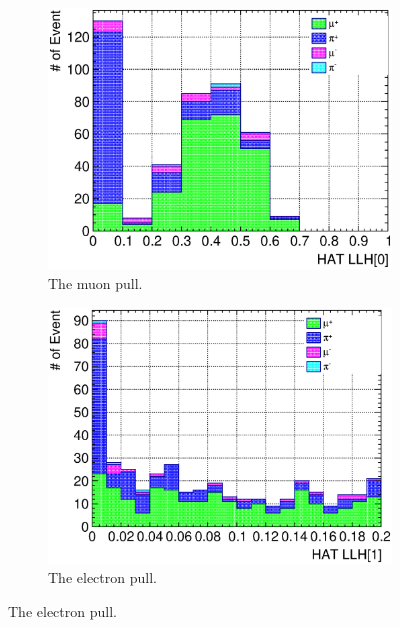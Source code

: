           \begin{figure}
               \centering
               \begin{subfigure}{\dbfigwid\textwidth}
                    \includegraphics[width=\textwidth]{figures/sel/sspi_TOP_hat_pid0_stack_al5.eps}
                    \caption{The muon pull.}
                    \label{subfig:sppi-pulls-1}
               \end{subfigure}
               \begin{subfigure}{\dbfigwid\textwidth}
                    \includegraphics[width=\textwidth]{figures/sel/sspi_TOP_hat_pid1_stack_al5.eps}
                    \caption{The electron pull.}
                    \label{subfig:sppi-pulls-2}

\end{subfigure}
\end{figure}
